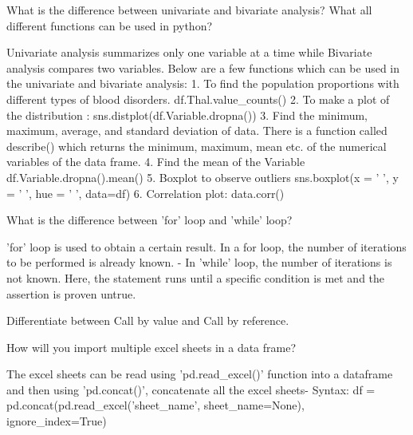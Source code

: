 	\begin{qanda}
		\begin{question}
What is the difference between univariate and bivariate analysis? What all different functions can be used in python?
		\end{question}
		\begin{answer}
Univariate analysis summarizes only one variable at a time while Bivariate analysis compares two variables. Below are a few functions which can be used in the univariate and bivariate analysis: 1. To find the population proportions with different types of blood disorders. df.Thal.value\_counts() 2. To make a plot of the distribution : sns.distplot(df.Variable.dropna()) 3. Find the minimum, maximum, average, and standard deviation of data. There is a function called describe() which returns the minimum, maximum, mean etc. of the numerical variables of the data frame. 4. Find the mean of the Variable df.Variable.dropna().mean() 5. Boxplot to observe outliers sns.boxplot(x = ' ', y = ' ', hue = ' ', data=df) 6. Correlation plot: data.corr()
		\end{answer}
	\end{qanda}

	\begin{qanda}
		\begin{question}
What is the difference between 'for' loop and 'while' loop?
		\end{question}
		\begin{answer}
'for' loop is used to obtain a certain result. In a for loop, the number of iterations to be performed is already known. - In 'while' loop, the number of iterations is not known. Here, the statement runs until a specific condition is met and the assertion is proven untrue.
		\end{answer}
	\end{qanda}

	\begin{qanda}
		\begin{question}
Differentiate between Call by value and Call by reference.
		\end{question}
		\begin{answer}
		\end{answer}
	\end{qanda}

	\begin{qanda}
		\begin{question}
How will you import multiple excel sheets in a data frame?
		\end{question}
		\begin{answer}
The excel sheets can be read using 'pd.read\_excel()' function into a dataframe and then using 'pd.concat()', concatenate all the excel sheets- Syntax: df = pd.concat(pd.read\_excel('sheet\_name', sheet\_name=None), ignore\_index=True)
		\end{answer}
	\end{qanda}

